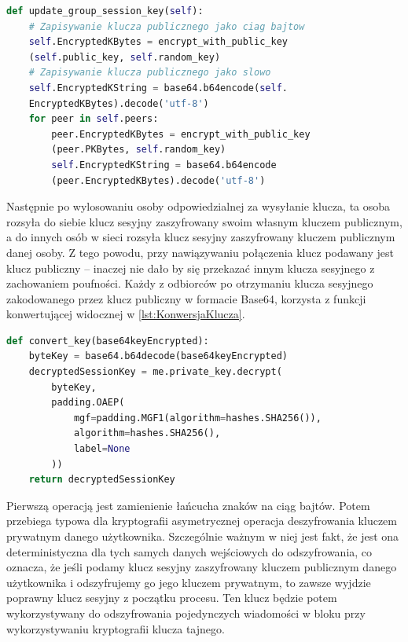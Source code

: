 \begin{lstlisting}[language=Python, extendedchars=true, caption={Funkcja aktualizująca grupowy klucz sesji}, label={lst:AktualizowanieSesji}]
def update_group_session_key(self):
    # Zapisywanie klucza publicznego jako ciag bajtow
    self.EncryptedKBytes = encrypt_with_public_key
    (self.public_key, self.random_key)
    # Zapisywanie klucza publicznego jako slowo
    self.EncryptedKString = base64.b64encode(self.
    EncryptedKBytes).decode('utf-8')
    for peer in self.peers:
        peer.EncryptedKBytes = encrypt_with_public_key
        (peer.PKBytes, self.random_key)
        self.EncryptedKString = base64.b64encode
        (peer.EncryptedKBytes).decode('utf-8')
\end{lstlisting}
Następnie po wylosowaniu osoby odpowiedzialnej za wysyłanie klucza, ta osoba rozsyła do siebie klucz sesyjny zaszyfrowany swoim własnym kluczem publicznym, a do innych osób w sieci  rozsyła klucz sesyjny zaszyfrowany kluczem publicznym danej osoby. Z tego powodu, przy nawiązywaniu połączenia klucz podawany jest klucz publiczny – inaczej nie dało by się przekazać innym klucza sesyjnego z zachowaniem poufności.
Każdy z odbiorców po otrzymaniu klucza sesyjnego zakodowanego przez klucz publiczny w formacie Base64, korzysta z funkcji konwertującej widocznej w \lstlistingname{ \ref{lst:KonwersjaKlucza}}. 

\begin{lstlisting}[language=Python, extendedchars=true, caption={Funkcja konwertująca klucz}, label={lst:KonwersjaKlucza}]
def convert_key(base64keyEncrypted):
    byteKey = base64.b64decode(base64keyEncrypted)
    decryptedSessionKey = me.private_key.decrypt(
        byteKey,
        padding.OAEP(
            mgf=padding.MGF1(algorithm=hashes.SHA256()),
            algorithm=hashes.SHA256(),
            label=None
        ))
    return decryptedSessionKey
\end{lstlisting}
Pierwszą operacją jest zamienienie łańcucha znaków na ciąg bajtów. Potem przebiega typowa dla kryptografii asymetrycznej operacja deszyfrowania kluczem prywatnym danego użytkownika. Szczególnie ważnym w niej jest fakt, że jest ona deterministyczna dla tych samych danych wejściowych do odszyfrowania, co oznacza, że jeśli podamy klucz sesyjny zaszyfrowany kluczem publicznym danego użytkownika i odszyfrujemy go jego kluczem prywatnym, to zawsze wyjdzie poprawny klucz sesyjny z początku procesu. Ten klucz będzie potem wykorzystywany do odszyfrowania pojedynczych wiadomości w bloku przy wykorzystywaniu kryptografii klucza tajnego.

